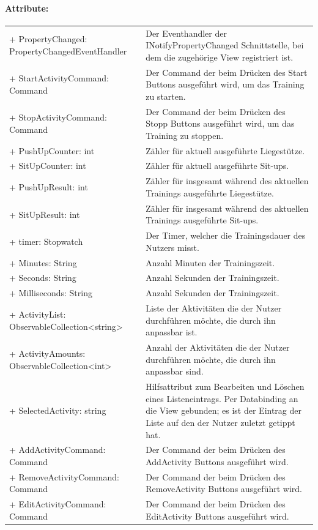 \documentclass[a4paper,12pt]{article}
\begin{document}
\paragraph{Attribute:}
\begin{tabular}{p{7cm}p{10cm}}
+ PropertyChanged: PropertyChangedEventHandler & Der Eventhandler der INotifyPropertyChanged Schnittstelle, bei dem die zugehörige View registriert ist. \\
+ StartActivityCommand: Command & Der Command der beim Drücken des Start Buttons ausgeführt wird, um das Training zu starten. \\
+ StopActivityCommand: Command & Der Command der beim Drücken des Stopp Buttons ausgeführt wird, um das Training zu stoppen. \\
+ PushUpCounter: int & Zähler für aktuell ausgeführte Liegestütze. \\
+ SitUpCounter: int & Zähler für aktuell ausgeführte Sit-ups. \\
+ PushUpResult: int & Zähler für insgesamt während des aktuellen Trainings ausgeführte Liegestütze. \\
+ SitUpResult: int & Zähler für insgesamt während des aktuellen Trainings ausgeführte Sit-ups. \\
+ timer: Stopwatch & Der Timer, welcher die Trainingsdauer des Nutzers misst. \\
+ Minutes: String & Anzahl Minuten der Trainingszeit. \\
+ Seconds: String &  Anzahl Sekunden der Trainingszeit. \\
+ Milliseconds: String & Anzahl Sekunden der Trainingszeit. \\ 
+ ActivityList: ObservableCollection<string> & Liste der Aktivitäten die der Nutzer durchführen möchte, die durch ihn anpassbar ist. \\
+ ActivityAmounts: ObservableCollection<int> & Anzahl der Aktivitäten die der Nutzer durchführen möchte, die durch ihn anpassbar sind. \\
+ SelectedActivity: string & Hilfsattribut zum Bearbeiten und Löschen eines Listeneintrags. Per Databinding an die View gebunden; es ist der Eintrag der Liste auf den der Nutzer zuletzt getippt hat. \\
+ AddActivityCommand: Command & Der Command der beim Drücken des AddActivity Buttons ausgeführt wird. \\
+ RemoveActivityCommand: Command & Der Command der beim Drücken des RemoveActivity Buttons ausgeführt wird. \\
+ EditActivityCommand: Command & Der Command der beim Drücken des EditActivity Buttons ausgeführt wird. \\
\end{tabular}
\end{document}
